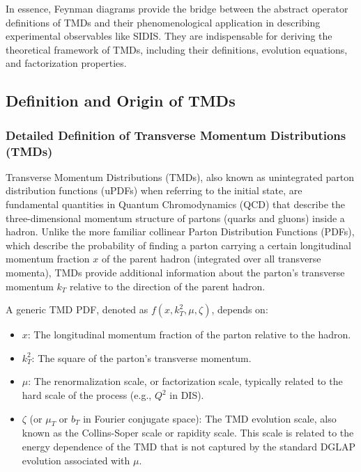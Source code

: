 \documentclass[11pt]{article}
\begin{document}
In essence, Feynman diagrams provide the bridge between the abstract operator definitions of TMDs and their phenomenological application in
describing experimental observables like SIDIS. They are indispensable for deriving the theoretical framework of TMDs, including their definitions,
evolution equations, and factorization properties.

\subsection{Definition and Origin of TMDs}

\subsubsection{Detailed Definition of Transverse Momentum Distributions (TMDs)}

Transverse Momentum Distributions (TMDs), also known as unintegrated parton distribution functions (uPDFs) when referring to the initial state, are
fundamental quantities in Quantum Chromodynamics (QCD) that describe the three-dimensional momentum structure of partons (quarks and gluons) inside a
hadron. Unlike the more familiar collinear Parton Distribution Functions (PDFs), which describe the probability of finding a parton carrying a
certain longitudinal momentum fraction $x$ of the parent hadron (integrated over all transverse momenta), TMDs provide additional information about
the parton's transverse momentum $k_T$ relative to the direction of the parent hadron.

A generic TMD PDF, denoted as $f(x, k_T^2, \mu, \zeta)$, depends on:
\begin{itemize}
  \item $x$: The longitudinal momentum fraction of the parton relative to the hadron.
  \item $k_T^2$: The square of the parton's transverse momentum.
  \item $\mu$: The renormalization scale, or factorization scale, typically related to the hard scale of the process (e.g., $Q^2$ in DIS).
  \item $\zeta$ (or $\mu_T$ or $b_T$ in Fourier conjugate space): The TMD evolution scale, also known as the Collins-Soper scale or rapidity scale. This scale is related to the energy dependence of the TMD that is not captured by the standard DGLAP evolution associated with $\mu$.
\end{itemize}
\end{document}
